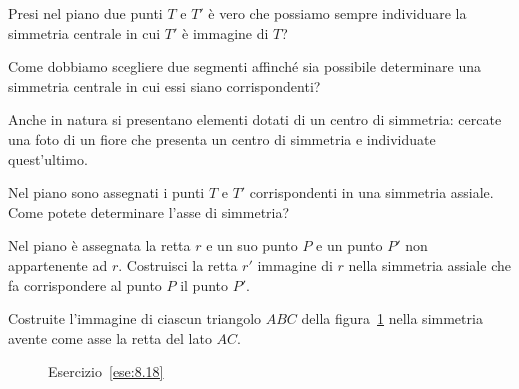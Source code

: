 \begin{esercizio}
\label{ese:8.4}
Presi nel piano due punti $T$ e $T'$ è vero che possiamo sempre 
individuare la simmetria centrale in cui $T'$ è immagine di $T$?
\end{esercizio}

\begin{esercizio}
\label{ese:8.5}
Come dobbiamo scegliere due segmenti affinché sia possibile 
determinare una simmetria centrale in cui essi siano corrispondenti?
\end{esercizio}

\begin{esercizio}
\label{ese:8.6}
Anche in natura si presentano elementi dotati di un centro di 
simmetria: cercate una foto di un fiore che presenta un centro di 
simmetria e individuate quest'ultimo.
\end{esercizio}


\begin{esercizio}
\label{ese:8.16}
Nel piano sono assegnati i punti $T$ e $T'$ corrispondenti in una 
simmetria assiale. Come potete determinare l'asse di simmetria?
\end{esercizio}

\noindent\begin{minipage}{0.6\textwidth}\parindent15pt
\begin{esercizio}
\label{ese:8.17}
Nel piano è assegnata la retta $r$ e un suo punto $P$ e un punto $P'$ 
non appartenente ad $r$. Costruisci la retta $r'$ immagine di $r$ 
nella simmetria assiale che fa corrispondere al punto $P$ il punto 
$P'$.
\end{esercizio}
\end{minipage}\hfil
\begin{minipage}{0.4\textwidth}
	\centering
\end{minipage}\vspace{5pt}

\begin{esercizio}
\label{ese:8.18}
Costruite l'immagine di ciascun triangolo $ABC$ della 
figura~\ref{fig:ese8.18} nella simmetria avente come asse la retta 
del lato $AC$.
\end{esercizio}

\begin{inaccessibleblock}
 \begin{figure}[!htb]
	\centering
	\caption{Esercizio~\ref{ese:8.18}}\label{fig:ese8.18}
\end{figure}
\end{inaccessibleblock}

